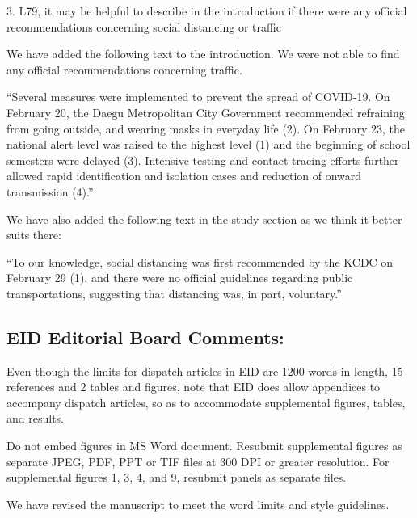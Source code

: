 \documentclass[12pt]{article}
\newcommand{\rev}{\subsection*}
\newcommand{\revtext}{\textsf}
\begin{document}
\revtext{3.	L79, it may be helpful to describe in the introduction if there were any official recommendations concerning social distancing or traffic}

We have added the following text to the introduction. We were not able to find any official recommendations concerning traffic.

``Several measures were implemented to prevent the spread of COVID-19. On February 20,
the Daegu Metropolitan City Government recommended refraining from going outside, and
wearing masks in everyday life (2). On February 23, the national alert level was raised to the
highest level (1) and the beginning of school semesters were delayed (3). Intensive testing and
contact tracing efforts further allowed rapid identification and isolation cases and reduction of
onward transmission (4).''

We have also added the following text in the study section as we think it better suits there:

``To our knowledge, social distancing was first recommended by the KCDC on February 29 (1), and there were no official guidelines regarding public transportations, suggesting that distancing was, in part, voluntary.''

\rev{EID Editorial Board Comments:}

\revtext{Even though the limits for dispatch articles in EID are 1200 words in length, 15 references and 2 tables and figures, note that EID does allow appendices to accompany dispatch articles, so as to accommodate supplemental figures, tables, and results.}

\revtext{Do not embed figures in MS Word document. Resubmit supplemental figures as separate JPEG, PDF, PPT or TIF files at 300 DPI or greater resolution. For supplemental figures 1, 3, 4, and 9, resubmit panels as separate files.}

We have revised the manuscript to meet the word limits and style guidelines.
\end{document}
